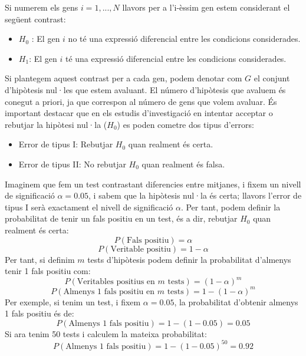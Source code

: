 \documentclass[english]{article}
\begin{document}
Si numerem els gens $i = 1,...,N$ llavors per a l'i-èssim gen estem considerant el següent contrast:
\begin{itemize}
\item $H_{0}$ : El gen $i$ no té una expressió diferencial entre les condicions considerades.
\item $H_{1}$: El gen $i$ té una expressió diferencial entre les condicions considerades.
\end{itemize}
Si plantegem aquest contrast per a cada gen, podem denotar com $G$ el conjunt d'hipòtesis nul·les que estem avaluant. El número d'hipòtesis que avaluem és conegut a priori, ja que correspon al número de gens que volem avaluar. És important destacar que en els estudis d'investigació en intentar acceptar o rebutjar la hipòtesi nul·la ($H_{0}$) es poden cometre dos tipus d'errors:
\begin{itemize}
\item Error de tipus I: Rebutjar $H_{0}$ quan realment és certa.
\item Error de tipus II: No rebutjar $H_{0}$ quan realment és falsa.
\end{itemize}
Imaginem que fem un test contrastant diferencies entre mitjanes, i fixem un nivell de significació $\alpha=0.05$, i sabem que la hipòtesis nul·la és certa; llavors l'error de tipus I serà exactament el nivell de significació $\alpha$. Per tant, podem definir la probabilitat de tenir un fals positiu en un test, és a dir, rebutjar $H_{0}$ quan realment és certa:
\begin{equation*}
P(\text{Fals positiu}) = \alpha
\end{equation*}
\begin{equation*}
P(\text{Veritable positiu}) = 1 - \alpha
\end{equation*}
Per tant, si definim $m$ tests d'hipòtesis podem definir la probabilitat d'almenys tenir 1 fals positiu com:
\begin{equation*}
P(\text{Veritables positius en $m$ tests}) = (1 - \alpha)^m
\end{equation*}
\begin{equation*}
P(\text{Almenys 1 fals positiu en $m$ tests}) = 1 - (1 - \alpha)^m
\end{equation*}
Per exemple, si tenim un test, i fixem $\alpha=0.05$, la probabilitat d'obtenir almenys 1 fals positiu és de:
\begin{equation*}
P(\text{Almenys 1 fals positiu}) = 1-(1-0.05)= 0.05
\end{equation*}
Si ara tenim 50 tests i calculem la mateixa probabilitat:
\begin{equation*}
P(\text{Almenys 1 fals positiu}) = 1-(1-0.05)^{50}= 0.92
\end{equation*}
\end{document}
